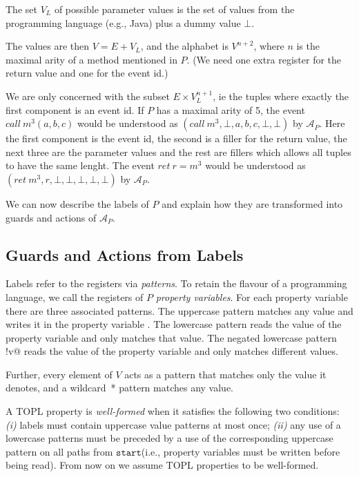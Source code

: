 \documentclass[9pt, preprint]{sigplanconf} %
\newcommand{\A}{\ensuremath{\mathcal{A}}}
\newcommand{\start}{\ensuremath{\mathtt{start}}\xspace}
\theoremstyle{definition}
\theoremstyle{remark}
\begin{document}
The set $V_L$ of possible parameter values is the set of values from
the programming language (e.g., Java)
plus a dummy value $\bot$.

The values are then $V = E + V_L$, and the alphabet is $V^{n+2}$,
where $n$ is the maximal arity of a method mentioned in $P$.
(We need one extra register for the return value and one for the event
id.)

We are only concerned with the subset $E \times V_L^{n+1}$, ie the
tuples where exactly the first component is an event
id. If $P$ has a maximal arity of 5, the event $call\ m^3(a, b, c)$
would be understood as $(call\ m^3, \bot,  a, b, c, \bot, \bot)$ by
$\A_P$. Here the first component is the event id, the second is a
filler for the return value, the next three are the parameter values and the rest are
fillers which allows all tuples to have the same lenght. The event $ret\ r = m^3$
would be understood as $(ret\ m^3, r, \bot, \bot, \bot, \bot, \bot)$ by
$\A_P$.

We can now describe the labels of $P$ and explain how they are transformed into guards and
actions of $\A_P$.

\subsection{Guards and Actions from Labels}

Labels refer to the registers via \emph{patterns}. To retain the
flavour of a programming language, we call the registers of $P$
\emph{property variables}.
%
For each property variable \Verb@v@ there are three associated patterns.
The uppercase pattern \Verb@V@ matches any value and writes it in the property variable \Verb@v@.
The lowercase pattern \Verb@v@ reads the value of the property variable \Verb@v@ and only matches that value.
The negated lowercase pattern \Verb@!v@ reads the value of the
property variable \Verb@v@ and only matches different values.

Further, every element of $V$ acts as a pattern that matches only the value it denotes,
and a wildcard~* pattern matches any value.

\smallskip
A TOPL property is \emph{well-formed} when it satisfies the following two conditions:
{\em (i)} labels must contain uppercase value patterns at most once; {\em (ii)}
any use of a lowercase patterns must be preceded by a use of the corresponding uppercase pattern on all paths from \start  (i.e., property variables must be written before being read).
From now on we assume TOPL properties to be well-formed.
\end{document}

